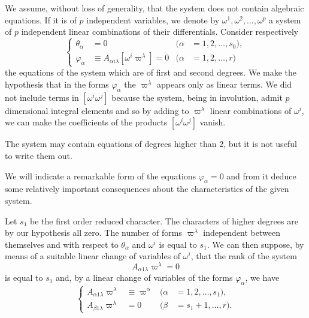 \fsec We assume, without loss of generality, that the system does not contain algebraic equations. If it is of $p$ independent variables, we denote by $\omega^{1},\omega^{2},\dots,\omega^{p}$ a system of $p$ independent linear combinations of their differentials. Consider respectively
\begin{equation}
  \label{eq:5.8}
  \left\{
    \begin{aligned}
      \theta_{\alpha}&=0&(\alpha&=1,2,\dots,s_{0}),\\
      \varphi_{\alpha}&\equiv A_{\alpha i\lambda}[\omega^{i}\varpi^{\lambda}]=0&(\alpha&=1,2,\dots,r)
    \end{aligned}
  \right.
\end{equation}
the equations of the system which are of first and second degrees. We make the hypothesis that in the forms $\varphi_{\alpha}$ the $\varpi^{\lambda}$ appears only as linear terms. We did not include terms in $[\omega^{i}\omega^{j}]$ because the system, being in involution, admit $p$ dimensional integral elements and so by adding to $\varpi^{\lambda}$ linear combinations of $\omega^{i}$, we can make the coefficients of the products $[\omega^{i}\omega^{j}]$ vanish.

The system may contain equations of degrees higher than $2$, but it is not useful to write them out.

We will indicate a remarkable form of the equations $\varphi_{\alpha}=0$ and from it deduce some relatively important consequences about the characteristics of the given system.

\vspace{12pt}\fsec Let $s_{1}$ be the first order reduced character. The characters of higher degrees are by our hypothesis all zero. The number of  forms $\varpi^{\lambda}$ independent between themselves and with respect to $\theta_{\alpha}$ and $\omega^{i}$ is equal to $s_{1}$. We can then suppose, by means of a suitable linear change of variables of $\omega^{i}$, that the rank of the system
\[
A_{\alpha1\lambda}\varpi^{\lambda}=0
\]
is equal to $s_{1}$ and, by a linear change of variables of the forms $\varphi_{\alpha}$, we have
\begin{equation}
  \label{eq:5.9}
  \left\{
    \begin{aligned}
      A_{\alpha 1 \lambda}\varpi^{\lambda}&\equiv \varpi^{\alpha}&(\alpha&=1,2,\dots,s_{1}),\\
      A_{\beta 1\lambda}\varpi^{\lambda}&=0&(\beta&=s_{1}+1,\dots,r).
    \end{aligned}
  \right.
\end{equation}

